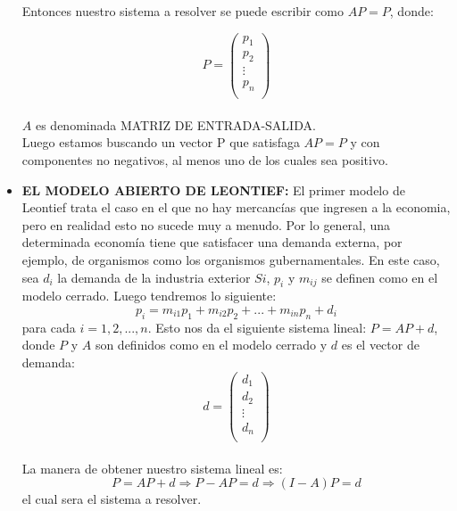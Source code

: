 \documentclass[10pt,a4paper]{article}
\begin{document}
\begin{multicols}{2}
\begin{itemize}
Entonces nuestro sistema a resolver se puede escribir como $AP = P$, donde:
	
 \[ P =
\left( \begin{array}{cccc}
p_{1} \\ 
p_{2} \\ 
\vdots  \\
p_{n} \\ 
\end{array} \right) \]\\
 $A$ es denominada MATRIZ DE ENTRADA-SALIDA.\\
 Luego estamos buscando un vector P que satisfaga $AP = P$ y con componentes no negativos, al menos uno de los cuales sea positivo.\\
 
 \item{\textbf{EL MODELO ABIERTO DE LEONTIEF: }}El primer modelo de Leontief trata el caso en el que no hay mercancías que ingresen a la economia, pero en realidad esto no sucede muy a menudo. Por lo general, una determinada economía tiene que satisfacer una demanda externa, por ejemplo, de organismos como los organismos gubernamentales. En este caso, sea $d_{i}$ la demanda de la industria exterior $Si$, $p_{i}$ y $m_{ij}$ se definen como en el modelo cerrado. Luego tendremos lo siguiente:
 $$ p_{i} = m_{i1}p_{1} + m_{i2}p_{2} + ... + m_{in}p_{n} + d_{i}$$
 para cada $i=1,2,...,n$. Esto nos da el siguiente sistema lineal:  $P = AP + d$, donde $P$ y $A$ son definidos como en el modelo cerrado y $d$ es el vector de demanda:\\
 	\[ d =
 	\left( \begin{array}{cccc}
 	d_{1} \\
 	d_{2} \\ 
 	\vdots  \\
 	d_{n} \\ 
 	\end{array} \right) \]\\
 	
 La manera de obtener nuestro sistema lineal es:
 	$$ P = AP +d \Rightarrow P-AP = d \Rightarrow (I-A)P = d$$
 	el cual sera el sistema a resolver.
 

\end{itemize}
\end{multicols}
\end{document}
